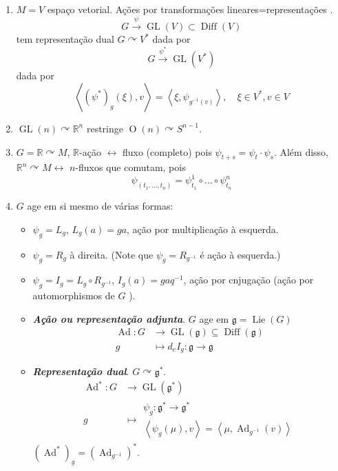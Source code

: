 \begin{example}\leavevmode 
	\begin{enumerate}
		\item $M=V$  espaço vetorial. Ações  por transformações  lineares=representações .
			\[G\overset{\psi}{\longrightarrow}\operatorname{GL}(V)\subset \operatorname{Diff}(V)\]
			tem representação dual  $G\curvearrowright V^*$ dada por
			\[G\overset{\psi^*}{\longrightarrow}\operatorname{GL}(V^*)\]
			dada por
			\[\left<(\psi^*)_g(\xi ),v\right> =\left<\xi,\psi_{g ^{-1}(v)}\right> ,\quad \xi \in V^*,v\in V\]
	
		\item $\operatorname{GL}(n)\curvearrowright \mathbb{R}^{n}$ restringe $\operatorname{O}(n)\curvearrowright S^{n-1}$.

		\item $G=\mathbb{R}\curvearrowright M$, $\mathbb{R}$-ação $\longleftrightarrow $ fluxo (completo) pois $\psi_{t+s}=\psi_t\cdot \psi_s$. Além disso, $\mathbb{R}^{n}\curvearrowright M \longleftrightarrow $ $n$-fluxos que comutam, pois
		\[\psi_{(t_1,\ldots,t_n)}=\psi_{t_1}^1\circ \ldots \circ \psi^n_{t_n}\]

	\item $G$ age em si mesmo de várias formas:
		\begin{itemize}
		\item $\psi_g=L_g$, $L_g(a)=ga$, ação por multiplicação à esquerda.

		\item $\psi_g=R_g$ à direita. (Note que  $\psi_g=R_{g ^{-1}}$ é ação à esquerda.)

		\item $\psi_g=I_g=L_g\circ R_{g ^{-1}}$, $ I_g(a)=gaq ^{-1}$, ação por cnjugação (ação por automorphismos de $G$ ).

		\item \textit{\textbf{Ação ou representação adjunta}}. $G$ age em $\mathfrak{g} =\operatorname{Lie}(G)$
			\begin{align*}
				\operatorname{Ad}: G &\longrightarrow \operatorname{GL}(\mathfrak{g})\subseteq \operatorname{Diff}(\mathfrak{g}) \\
				g &\longmapsto d_e I_g:\mathfrak{g} \to \mathfrak{g}
			\end{align*}
			
		\item \textit{\textbf{Representação dual}}. $G\curvearrowright \mathfrak{g}^*$. 
			\begin{align*}
				\operatorname{Ad}^*: G &\longrightarrow \operatorname{GL}(\mathfrak{g}^*) \\
				g &\longmapsto \begin{aligned}
				\psi_g:\mathfrak{g}^*\longrightarrow \mathfrak{g}^* \\
				\left<\psi_g(\mu),v\right> =\left<\mu,\operatorname{Ad}_{g ^{-1}}(v)\right> 
				\end{aligned}
			\end{align*}
			$(\operatorname{Ad}^* )_g=(\operatorname{Ad}_{g ^{-1}})^*$.



\end{itemize}
\end{enumerate}
\end{example}
